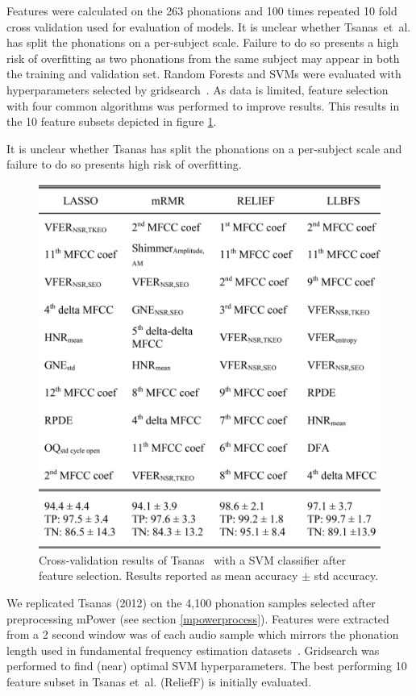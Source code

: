 \documentclass[12pt, twoside]{book}
\begin{document}
Features were calculated on the 263 phonations and 100 times repeated 10 fold cross validation used for evaluation of models. It is unclear whether Tsanas~et~al. has split the phonations on a per-subject scale. Failure to do so presents a high risk of overfitting as two phonations from the same subject may appear in both the training and validation set. Random Forests and SVMs were evaluated with hyperparameters selected by gridsearch~\cite{gridsearch}. As data is limited, feature selection with four common algorithms was performed to improve results. This results in the 10 feature subsets depicted in figure \ref{tsanasresults}.

\begin{highlight}
It is unclear whether Tsanas has split the phonations on a per-subject scale and failure to do so presents high risk of overfitting.
\end{highlight}

\begin{figure}[h]
\caption{Cross-validation results of Tsanas~\cite{tsanas2012novel} with a SVM classifier after feature selection. Results reported as mean accuracy $\pm$ std accuracy.}
\label{tsanasresults}
\centering\includegraphics[width=0.75\linewidth]{tsanas.png}
\end{figure}
 
We replicated Tsanas (2012) on the 4,100 phonation samples selected after preprocessing mPower (see section \ref{mpowerprocess}). Features were extracted from a 2 second window was of each audio sample which mirrors the phonation length used in fundamental frequency estimation datasets~\cite{tsanas2014robust}. Gridsearch was performed to find (near) optimal SVM hyperparameters. The best performing 10 feature subset in Tsanas et~al. (ReliefF) is initially evaluated.
\end{document}
